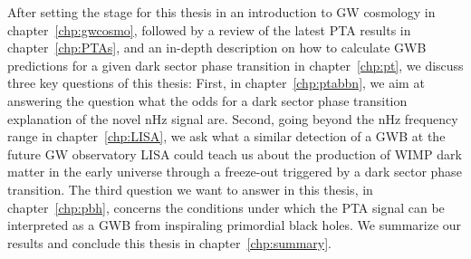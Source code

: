 After setting the stage for this thesis in an introduction to \ac{GW} cosmology in chapter~\ref{chp:gwcosmo}, followed by a review of the latest \ac{PTA} results in chapter~\ref{chp:PTAs}, and an in-depth description on how to calculate \ac{GWB} predictions for a given dark sector phase transition in chapter~\ref{chp:pt}, we discuss three key questions of this thesis: First, in chapter~\ref{chp:ptabbn}, we aim  at answering the question what the odds for a dark sector phase transition explanation of the novel nHz signal are. Second, going beyond the nHz frequency range in chapter~\ref{chp:LISA}, we ask what a similar detection of a \ac{GWB} at the future \ac{GW} observatory \acs{LISA} could teach us about the production of \acs{WIMP} dark matter in the early universe through a freeze-out triggered by a dark sector phase transition. The third question we want to answer in this thesis, in chapter~\ref{chp:pbh}, concerns the conditions under which the \ac{PTA} signal can be interpreted as a \ac{GWB} from inspiraling primordial black holes. We summarize our results and conclude this thesis in chapter~\ref{chp:summary}.